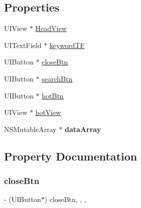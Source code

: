 \subsection*{Properties}
\begin{DoxyCompactItemize}
\item 
U\+I\+View $\ast$ \mbox{\hyperlink{category_search_view_controller_07_08_a8d85430e39d690c81f3218005347fafc}{Head\+View}}
\item 
U\+I\+Text\+Field $\ast$ \mbox{\hyperlink{category_search_view_controller_07_08_abd3b8403d9937fd925a653206d3826a2}{keyword\+TF}}
\item 
U\+I\+Button $\ast$ \mbox{\hyperlink{category_search_view_controller_07_08_a5083f216dc1f58eb28b3b807a8896ef2}{close\+Btn}}
\item 
U\+I\+Button $\ast$ \mbox{\hyperlink{category_search_view_controller_07_08_ae2b40864eec68ff39afccd756461df4b}{search\+Btn}}
\item 
U\+I\+Button $\ast$ \mbox{\hyperlink{category_search_view_controller_07_08_abddc4f4963f24b5c149c0e2b362b5818}{hot\+Btn}}
\item 
U\+I\+View $\ast$ \mbox{\hyperlink{category_search_view_controller_07_08_a4fa78f07cef68d9cab56f98af0922cb0}{hot\+View}}
\item 
\mbox{\label{category_search_view_controller_07_08_a4c94282e5ffd004fde585dd16b16be63}} 
N\+S\+Mutable\+Array $\ast$ {\bfseries data\+Array}
\end{DoxyCompactItemize}


\subsection{Property Documentation}
\mbox{\label{category_search_view_controller_07_08_a5083f216dc1f58eb28b3b807a8896ef2}} 
\subsubsection{\texorpdfstring{close\+Btn}{closeBtn}}
{\footnotesize\ttfamily -\/ (U\+I\+Button$\ast$) close\+Btn\hspace{0.3cm}{\ttfamily [read]}, {\ttfamily [write]}, {\ttfamily [nonatomic]}, {\ttfamily [strong]}}

